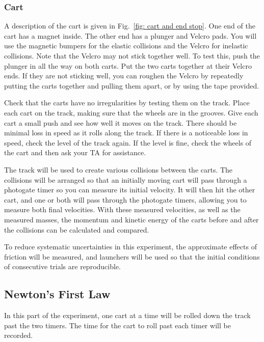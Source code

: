 \documentclass[addpoints]{physlabs}
\begin{document}
\begin{labsection}
\begin{experiment}
    \subsubsection*{Cart}

    A description of the cart is given in Fig.~\ref{fig: cart and end stop}. One end of the cart has a magnet inside. The other end has a plunger and Velcro pads. You will use the magnetic bumpers for the elastic collisions and the Velcro for inelastic collisions. Note that the Velcro may not stick together well. To test this, push the plunger in all the way on both carts. Put the two carts together at their Velcro ends. If they are not sticking well, you can roughen the Velcro by repeatedly putting the carts together and pulling them apart, or by using the tape provided.

    Check that the carts have no irregularities by testing them on the track. Place each cart on the track, making sure that the wheels are in the grooves. Give each cart a small push and see how well it moves on the track. There should be minimal loss in speed as it rolls along the track. If there is a noticeable loss in speed, check the level of the track again. If the level is fine, check the wheels of the cart and then ask your TA for assistance.
    
    The track will be used to create various collisions between the carts. The collisions will be arranged so that an initially moving cart will pass through a photogate timer so you can measure its initial velocity. It will then hit the other cart, and one or both will pass through the photogate timers, allowing you to measure both final velocities. With these measured velocities, as well as the measured masses, the momentum and kinetic energy of the carts before and after the collisions can be calculated and compared.
    
    To reduce systematic uncertainties in this experiment, the approximate effects of friction will be measured, and launchers will be used so that the initial conditions of consecutive trials are reproducible.

    \subsection*{Newton's First Law}

    In this part of the experiment, one cart at a time will be rolled down the track past the two timers. The time for the cart to roll past each timer will be recorded.


\end{experiment}
\end{labsection}
\end{document}
